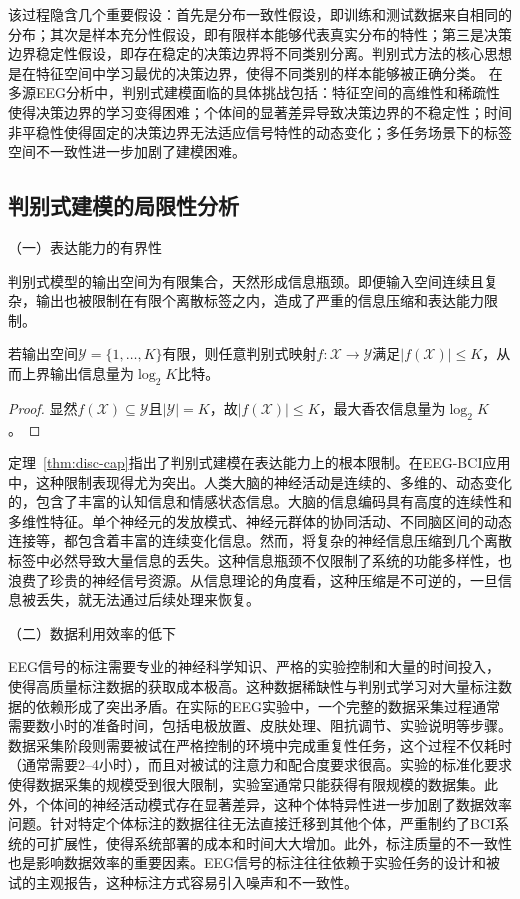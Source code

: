 该过程隐含几个重要假设：首先是分布一致性假设，即训练和测试数据来自相同的分布；其次是样本充分性假设，即有限样本能够代表真实分布的特性；第三是决策边界稳定性假设，即存在稳定的决策边界将不同类别分离。判别式方法的核心思想是在特征空间中学习最优的决策边界，使得不同类别的样本能够被正确分类。
在多源EEG分析中，判别式建模面临的具体挑战包括：特征空间的高维性和稀疏性使得决策边界的学习变得困难；个体间的显著差异导致决策边界的不稳定性；时间非平稳性使得固定的决策边界无法适应信号特性的动态变化；多任务场景下的标签空间不一致性进一步加剧了建模困难。


\subsection{判别式建模的局限性分析}

（一）表达能力的有界性

判别式模型的输出空间为有限集合，天然形成信息瓶颈。即便输入空间连续且复杂，输出也被限制在有限个离散标签之内，造成了严重的信息压缩和表达能力限制。

\begin{theorem}[判别式输出空间的表达瓶颈]
\label{thm:disc-cap}
若输出空间$\mathcal{Y}=\{1,\dots,K\}$有限，则任意判别式映射$f:\mathcal{X}\to \mathcal{Y}$满足$|f(\mathcal{X})|\le K$，从而上界输出信息量为$\log_2 K$比特。
\end{theorem}
\begin{proof}
显然$f(\mathcal{X}) \subseteq \mathcal{Y}$且$|\mathcal{Y}|=K$，故$|f(\mathcal{X})|\le K$，最大香农信息量为$\log_2 K$。
\end{proof}

定理~\ref{thm:disc-cap}指出了判别式建模在表达能力上的根本限制。在EEG-BCI应用中，这种限制表现得尤为突出。人类大脑的神经活动是连续的、多维的、动态变化的，包含了丰富的认知信息和情感状态信息。大脑的信息编码具有高度的连续性和多维性特征。单个神经元的发放模式、神经元群体的协同活动、不同脑区间的动态连接等，都包含着丰富的连续变化信息。然而，将复杂的神经信息压缩到几个离散标签中必然导致大量信息的丢失。这种信息瓶颈不仅限制了系统的功能多样性，也浪费了珍贵的神经信号资源。从信息理论的角度看，这种压缩是不可逆的，一旦信息被丢失，就无法通过后续处理来恢复。


（二）数据利用效率的低下

EEG信号的标注需要专业的神经科学知识、严格的实验控制和大量的时间投入，使得高质量标注数据的获取成本极高。这种数据稀缺性与判别式学习对大量标注数据的依赖形成了突出矛盾。在实际的EEG实验中，一个完整的数据采集过程通常需要数小时的准备时间，包括电极放置、皮肤处理、阻抗调节、实验说明等步骤。数据采集阶段则需要被试在严格控制的环境中完成重复性任务，这个过程不仅耗时（通常需要2--4小时），而且对被试的注意力和配合度要求很高。实验的标准化要求使得数据采集的规模受到很大限制，实验室通常只能获得有限规模的数据集。此外，个体间的神经活动模式存在显著差异，这种个体特异性进一步加剧了数据效率问题。针对特定个体标注的数据往往无法直接迁移到其他个体，严重制约了BCI系统的可扩展性，使得系统部署的成本和时间大大增加。此外，标注质量的不一致性也是影响数据效率的重要因素。EEG信号的标注往往依赖于实验任务的设计和被试的主观报告，这种标注方式容易引入噪声和不一致性。

